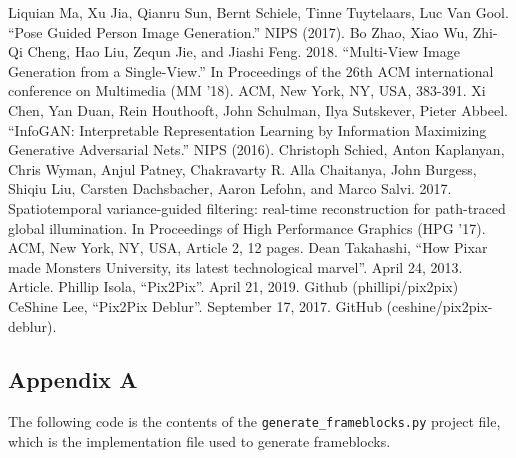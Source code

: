 \documentclass[conference]{IEEEtran}
\begin{document}
\begin{thebibliography}{15}
 Liquian Ma, Xu Jia, Qianru Sun, Bernt Schiele, Tinne Tuytelaars, Luc Van Gool. ``Pose Guided Person Image Generation.'' NIPS (2017).
 Bo Zhao, Xiao Wu, Zhi-Qi Cheng, Hao Liu, Zequn Jie, and Jiashi Feng. 2018. ``Multi-View Image Generation from a Single-View.'' In Proceedings of the 26th ACM international conference on Multimedia (MM '18). ACM, New York, NY, USA, 383-391.
 Xi Chen, Yan Duan, Rein Houthooft, John Schulman, Ilya Sutskever, Pieter Abbeel. ``InfoGAN: Interpretable Representation Learning by Information Maximizing Generative Adversarial Nets.'' NIPS (2016).
 Christoph Schied, Anton Kaplanyan, Chris Wyman, Anjul Patney, Chakravarty R. Alla Chaitanya, John Burgess, Shiqiu Liu, Carsten Dachsbacher, Aaron Lefohn, and Marco Salvi. 2017. Spatiotemporal variance-guided filtering: real-time reconstruction for path-traced global illumination. In Proceedings of High Performance Graphics (HPG '17). ACM, New York, NY, USA, Article 2, 12 pages.
 Dean Takahashi, ``How Pixar made Monsters University, its
latest technological marvel''. April 24, 2013. Article.
 Phillip Isola, ``Pix2Pix''. April 21, 2019. Github
(phillipi/pix2pix)
 CeShine Lee, ``Pix2Pix Deblur''. September 17, 2017. GitHub
(ceshine/pix2pix-deblur).
\end{thebibliography}

\onecolumn

\begin{center}
\section*{Appendix A}
\label{app:a}
\end{center}

The following code is the contents of the
\texttt{generate_frameblocks.py} project file, which is the
implementation file used to generate frameblocks.

\bigskip
\end{document}
